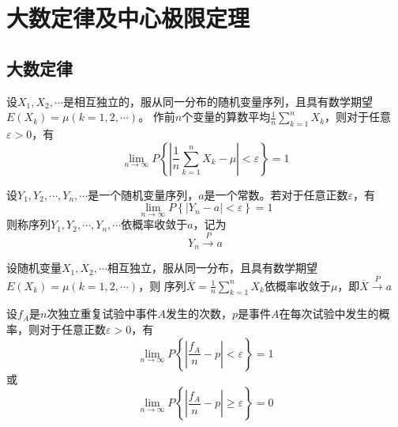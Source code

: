 \section{大数定律及中心极限定理}
\subsection{大数定律}

\begin{theorem}
    设$X_1,X_2,\cdots$是相互独立的，服从同一分布的随机变量序列，且具有数学期望$E(X_k)=\mu (k=1,2,\cdots)$。
    作前$n$个变量的算数平均$\displaystyle{\frac{1}{n} \sum_{k=1}^n X_k }$，则对于任意$\varepsilon>0$，有
    $$\lim_{n\to \infty} P \left\{ \left\lvert  \frac{1}{n} \sum_{k=1}^n X_k-\mu \right\rvert <\varepsilon \right\} =1 $$
\end{theorem}

\begin{definition}
    设$Y_1,Y_2,\cdots,Y_n,\cdots$是一个随机变量序列，$a$是一个常数。若对于任意正数$\varepsilon$，有
    $$\lim_{n\to \infty} P \left\{ \left\lvert Y_n-a \right\rvert <\varepsilon \right\} =1 $$
    则称序列$Y_1,Y_2,\cdots,Y_n,\cdots${\heiti 依概率收敛于$a$}，记为
    $$Y_n \stackrel{P}{\longrightarrow} a$$
\end{definition}

\begin{theorem}
    设随机变量$X_1,X_2,\cdots$相互独立，服从同一分布，且具有数学期望$E(X_k)=\mu (k=1,2,\cdots)$，则
    序列$\displaystyle{\overline{X}=\frac{1}{n}\sum _{k=1}^n X_k}$依概率收敛于$\mu$，即$\overline{X} \stackrel{P}{\longrightarrow} a$
\end{theorem}

\begin{theorem}[伯努利大数定理]
    设$f_A$是$n$次独立重复试验中事件$A$发生的次数，$p$是事件$A$在每次试验中发生的概率，则对于任意正数$\varepsilon>0$，有
    $$\lim_{n\to \infty} P \left\{ \left\lvert  \frac{f_A}{n}-p  \right\rvert <\varepsilon \right\} =1 $$或
    $$\lim_{n\to \infty} P \left\{ \left\lvert  \frac{f_A}{n}-p  \right\rvert \geq \varepsilon \right\} =0 $$
\end{theorem}

